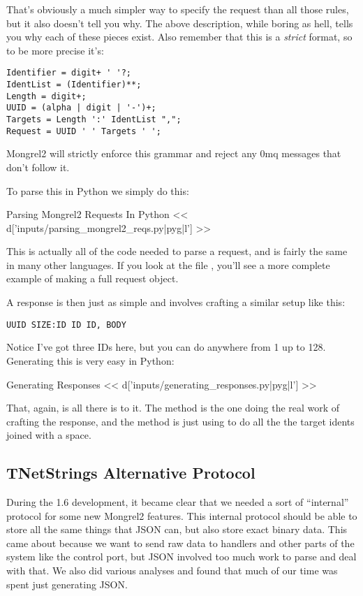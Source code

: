 That's obviously a much simpler way to specify the request than all those
rules, but it also doesn't tell you why.  The above description, while
boring as hell, tells you why each of these pieces exist.  Also remember
that this is a \emph{strict} format, so to be more precise it's:

\begin{Verbatim}
Identifier = digit+ ' '?;
IdentList = (Identifier)**;
Length = digit+;
UUID = (alpha | digit | '-')+;
Targets = Length ':' IdentList ",";
Request = UUID ' ' Targets ' ';
\end{Verbatim}

Mongrel2 will strictly enforce this grammar and reject any 0mq messages that
don't follow it.

To parse this in Python we simply do this:

\begin{code}{Parsing Mongrel2 Requests In Python}
<< d['inputs/parsing_mongrel2_reqs.py|pyg|l'] >>
\end{code}

This is actually all of the code needed to parse a request, and is
fairly the same in many other languages.  If you look at the file
, you'll see a more complete
example of making a full request object.

A response is then just as simple and involves crafting a similar
setup like this:

\begin{Verbatim}
UUID SIZE:ID ID ID, BODY
\end{Verbatim}

Notice I've got three IDs here, but you can do anywhere from 1 up to 128.  Generating
this is very easy in Python:

\begin{code}{Generating Responses}
<< d['inputs/generating_responses.py|pyg|l'] >>
\end{code}

That, again, is all there is to it.  The  method is the
one doing the real work of crafting the response, and the 
method is just using  to do all the the target idents
joined with a space.

\subsection{TNetStrings Alternative Protocol}
During the 1.6 development, it became clear that we needed a sort of ``internal''
protocol for some new Mongrel2 features.  This internal protocol should be
able to store all the same things that JSON can, but also store exact binary
data.  This came about because we want to send raw data to handlers and
other parts of the system like the control port, but JSON involved too
much work to parse and deal with that.  We also did various analyses and
found that much of our time was spent just generating JSON.

